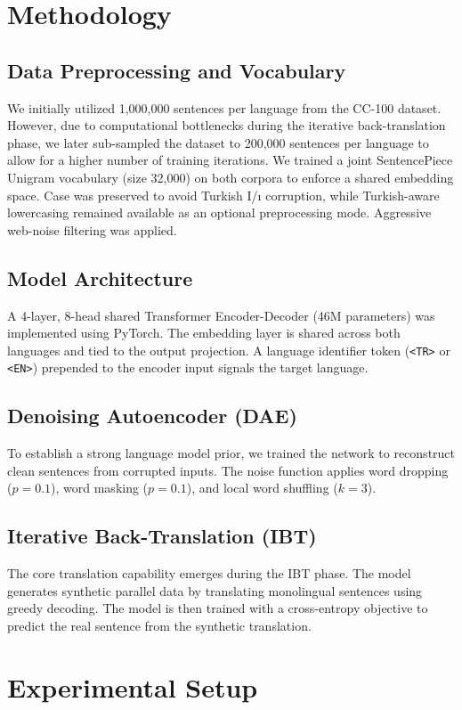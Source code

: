 \documentclass[runningheads]{llncs}
\begin{document}
\section{Methodology}
\subsection{Data Preprocessing and Vocabulary}
We initially utilized 1,000,000 sentences per language from the CC-100 dataset. However, due to computational bottlenecks during the iterative back-translation phase, we later sub-sampled the dataset to 200,000 sentences per language to allow for a higher number of training iterations. We trained a joint SentencePiece Unigram vocabulary (size 32,000) on both corpora to enforce a shared embedding space. Case was preserved to avoid Turkish I/ı corruption, while Turkish-aware lowercasing remained available as an optional preprocessing mode. Aggressive web-noise filtering was applied.

\subsection{Model Architecture}
A 4-layer, 8-head shared Transformer Encoder-Decoder (46M parameters) was implemented using PyTorch. The embedding layer is shared across both languages and tied to the output projection. A language identifier token (\texttt{<TR>} or \texttt{<EN>}) prepended to the encoder input signals the target language.

\subsection{Denoising Autoencoder (DAE)}
To establish a strong language model prior, we trained the network to reconstruct clean sentences from corrupted inputs. The noise function applies word dropping ($p=0.1$), word masking ($p=0.1$), and local word shuffling ($k=3$).

\subsection{Iterative Back-Translation (IBT)}
The core translation capability emerges during the IBT phase. The model generates synthetic parallel data by translating monolingual sentences using greedy decoding. The model is then trained with a cross-entropy objective to predict the real sentence from the synthetic translation.

\section{Experimental Setup}
\end{document}
